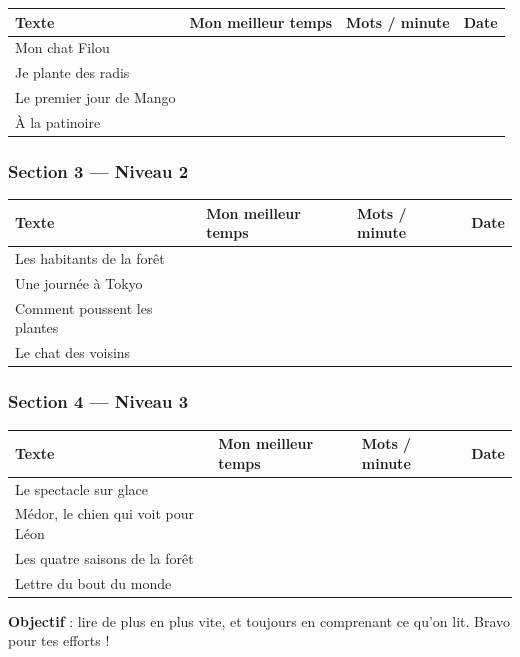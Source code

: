 \documentclass[
  french,
  14pt,
  a4paper,
]{extarticle}
\newcounter{none} %
\begin{document}
{\def\LTcaptype{none} %
\begin{longtable}[]{@{}llll@{}}
\toprule\noalign{}
Texte & Mon meilleur temps & Mots / minute & Date \\
\midrule\noalign{}
\endhead
\bottomrule\noalign{}
\endlastfoot
Mon chat Filou & & & \\
Je plante des radis & & & \\
Le premier jour de Mango & & & \\
À la patinoire & & & \\
\end{longtable}
}

\subsubsection{Section 3 --- Niveau 2}\label{section-3-niveau-2-1}

{\def\LTcaptype{none} %
\begin{longtable}[]{@{}llll@{}}
\toprule\noalign{}
Texte & Mon meilleur temps & Mots / minute & Date \\
\midrule\noalign{}
\endhead
\bottomrule\noalign{}
\endlastfoot
Les habitants de la forêt & & & \\
Une journée à Tokyo & & & \\
Comment poussent les plantes & & & \\
Le chat des voisins & & & \\
\end{longtable}
}

\subsubsection{Section 4 --- Niveau 3}\label{section-4-niveau-3-1}

{\def\LTcaptype{none} %
\begin{longtable}[]{@{}llll@{}}
\toprule\noalign{}
Texte & Mon meilleur temps & Mots / minute & Date \\
\midrule\noalign{}
\endhead
\bottomrule\noalign{}
\endlastfoot
Le spectacle sur glace & & & \\
Médor, le chien qui voit pour Léon & & & \\
Les quatre saisons de la forêt & & & \\
Lettre du bout du monde & & & \\
\end{longtable}
}

\textbf{Objectif} : lire de plus en plus vite, et toujours en comprenant
ce qu'on lit. Bravo pour tes efforts !
\end{document}

